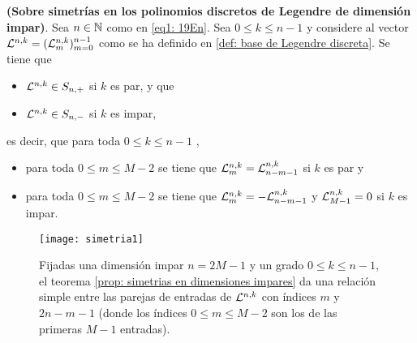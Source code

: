 \begin{teo}
\label{prop: simetrias en dimensiones impares}
\textbf{(Sobre simetrías
en los polinomios discretos de Legendre de dimensión impar)}. 
Sea $n \in \mathbb{N}$ como en \eqref{eq1: 19En}.
Sea $0 \leq k \leq n-1$ y
considere al vector $\mathcal{L}^{n,k}=(\mathcal{L}^{n,k}_{m})_{m=0}^{n-1}$
como se ha definido en \ref{def: base de Legendre discreta}. 
Se tiene que 
\begin{itemize}
\item $\mathcal{L}^{n,k} \in S_{n,+}$ si $k$ es par, y que
\item $\mathcal{L}^{n,k} \in S_{n,-}$ si $k$ es impar,
\end{itemize}
es decir, que para toda $0 \leq k \leq n-1$ ,
\begin{itemize}
\item para toda $0 \leq m \leq M-2$ se tiene que 
$\mathcal{L}^{n,k}_{m} = \mathcal{L}^{n,k}_{n-m-1}$ si $k$ es par y
\item para toda $0 \leq m \leq M-2$ 
se tiene que $\mathcal{L}^{n,k}_{m} = -\mathcal{L}^{n,k}_{n-m-1}$ y 
$\mathcal{L}^{n, k}_{M-1}=0$ si $k$ es impar.
\end{itemize}
\end{teo}
\begin{figure}[H]
\centering\captionsetup{format = hang}
	\begin{measuredfigure}
		\texttt{[image: simetria1]} 
		\caption{	
		Fijadas una dimensión impar $n=2M-1$ 
		y un grado $0 \leq k \leq n-1$,
		el teorema \ref{prop: simetrias en dimensiones impares}
		da una relación simple entre las parejas 
		de entradas de $\mathcal{L}^{n,k}$ con índices $m$ y $2n-m-1$ 
		(donde los índices $0 \leq m \leq M-2$ son los de las primeras
		$M-1$ entradas).}
 	\end{measuredfigure}
 \end{figure}



\begin{comment}

{\huge{$\cali{L}^{n,k} = 
\left(
\cali{L}^{n,k}_{0} , \cali{L}^{n,k}_{1}, \ldots ,
\cali{L}^{n,k}_{M-2}, \cali{L}^{n,k}_{M-1}, \cali{L}^{n,k}_{M},
\ldots , \cali{L}^{n,k}_{n-2}, \cali{L}^{n,k}_{n-1}
\right)
$}}

\vspace{2cm}

{\huge{$\cali{L}^{n,k} = 
\left(
\cali{L}^{n,k}_{0} , \cali{L}^{n,k}_{1}, \ldots ,
\cali{L}^{n,k}_{M-1}, \cali{L}^{n,k}_{M},
\ldots , \cali{L}^{n,k}_{n-2}, \cali{L}^{n,k}_{n-1}
\right)
$}}

\end{comment}



